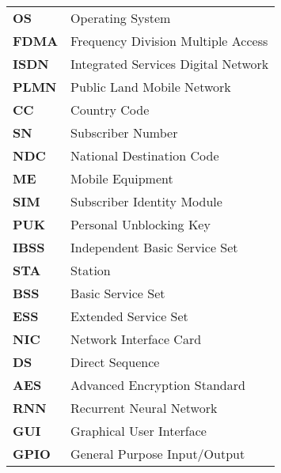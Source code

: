 \begin{tabular}{p{3cm}l}
\textbf{OS}			& Operating System\\
\textbf{FDMA}		& Frequency Division Multiple Access \\
\textbf{ISDN}		& Integrated Services Digital Network \\
 \textbf{PLMN}		& Public Land Mobile Network \\
 \textbf{CC}		& Country Code \\
\textbf{SN}			& Subscriber Number \\
\textbf{NDC}		& National Destination Code\\ 
\textbf{ME}			& Mobile Equipment \\
\textbf{SIM}		& Subscriber Identity Module\\ 
\textbf{PUK}		& Personal Unblocking Key\\
\textbf{IBSS}		& Independent Basic Service Set\\ 
\textbf{STA}		& Station \\
\textbf{BSS}		& Basic Service Set \\
\textbf{ESS}		& Extended Service Set \\
\textbf{NIC}		& Network Interface Card \\
\textbf{DS}			& Direct Sequence \\
\textbf{AES}		& Advanced Encryption Standard \\
\textbf{RNN}		& Recurrent Neural Network\\
\textbf{GUI}		& Graphical User Interface\\
\textbf{GPIO}		& General Purpose Input/Output\\
\end{tabular}

